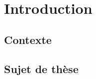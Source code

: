 \clearpage
\section{Introduction}
\label{sec:Intro}

\subsection{Contexte}

\subsection{Sujet de thèse}











